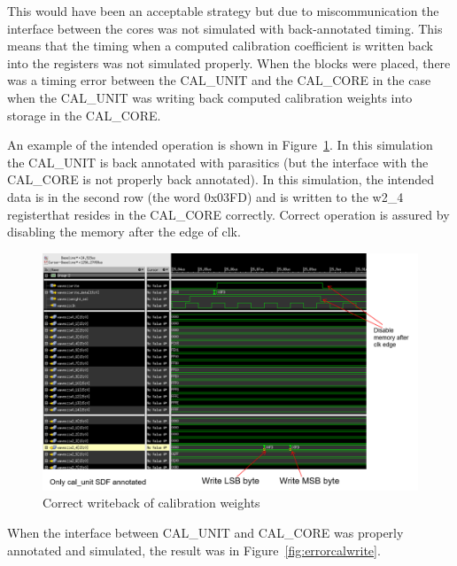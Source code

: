 This would have been an acceptable strategy but due to miscommunication the interface between the cores was not simulated with back-annotated timing. This means that the timing when a computed calibration coefficient is written back into the registers was not simulated properly. When the blocks were placed, there was a timing error between the CAL\_UNIT and the CAL\_CORE in the case when the CAL\_UNIT was writing back computed calibration weights into storage in the CAL\_CORE.

An example of the intended operation is shown in Figure~\ref{fig:correctcalwrite}. In this simulation the CAL\_UNIT is back annotated with parasitics (but the interface with the CAL\_CORE is not properly back annotated). In this simulation, the intended data is in the second row (the word 0x03FD) and is written to the w2\_4 registerthat resides in the CAL\_CORE correctly. Correct operation is assured by disabling the memory after the edge of clk.

\begin{figure}[htb]
\centering
\begin{center}
\includegraphics[width=1.0\textwidth]{figures/CorrectCalWrite.png}
\end{center}
\caption{Correct writeback of calibration weights}
\label{fig:correctcalwrite}
\end{figure}


When the interface between CAL\_UNIT and CAL\_CORE was properly annotated and simulated, the result was in Figure~\ref{fig:errorcalwrite}.

